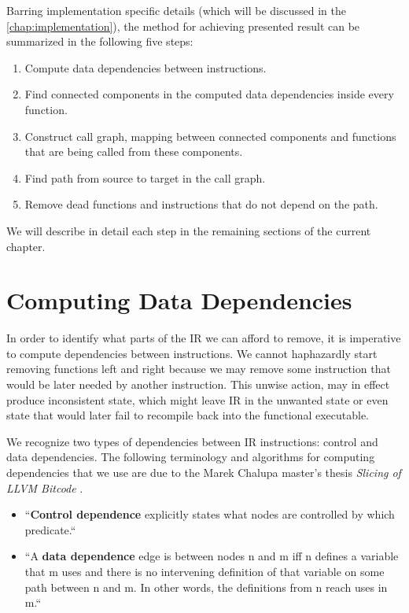 \documentclass[12pt, twoside]{fithesis2}
\renewcommand{\_}{\leavevmode \kern0.07em\vbox{\hrule width0.4em}}
\newcommand{\squarebullet}{\textcolor{black}{\raisebox{0.15em}{\rule{4pt}{4pt}}}}
\newenvironment{myItemize}{
  \begin{itemize}[
    leftmargin=2em,
    rightmargin=1em,
    itemsep=\parskip,
    parsep=0em,
    topsep=0em,
    partopsep=0em
]
  \renewcommand{\labelitemi}{\squarebullet}
  \renewcommand{\labelitemii}{\textbullet}
}{
  \end{itemize}
}
\newenvironment{myEnumerate}{
  \begin{enumerate}[
    leftmargin=2em,
    rightmargin=1em,
    itemsep=\parskip,
    parsep=0em,
    topsep=0em,
    partopsep=0em
]
}{
  \end{enumerate}
}
\begin{document}
\bigskip
Barring implementation specific details (which will be discussed in the
\autoref{chap:implementation}), the method for achieving presented result can be
summarized in the following five steps:

\begin{myEnumerate}
\item Compute data dependencies between instructions.
\item Find connected components in the computed data dependencies inside
every function.
\item Construct call graph, mapping between connected components and functions
that are being called from these components.
\item Find path from source to target in the call graph.
\item Remove dead functions and instructions that do not depend on the path.
\end{myEnumerate}

We will describe in detail each step in the remaining sections of the current
chapter.

\section{Computing Data Dependencies}
\label{sec:design-dep}

In order to identify what parts of the IR we can afford to remove, it is
imperative to compute dependencies between instructions. We cannot haphazardly
start removing functions left and right because we may remove some instruction
that would be later needed by another instruction.
This unwise action, may in effect produce inconsistent state, which might leave
IR in the unwanted state or even state that would later fail to recompile back
into the functional executable.

We recognize two types of dependencies between IR instructions: control and data
dependencies.
The following terminology and algorithms for computing dependencies that we use
are due to the Marek Chalupa master's thesis \textit{Slicing of LLVM Bitcode}
\cite{dg}.

\begin{myItemize}
\item ``\textbf{Control dependence} explicitly states what nodes are
controlled by which predicate.``
\item ``A \textbf{data dependence} edge is between nodes n and
m iff n defines a variable that m uses and there is no intervening definition
of that variable on some path between n and m. In other words, the definitions
from n reach uses in m.``
\end{myItemize}
\end{document}
